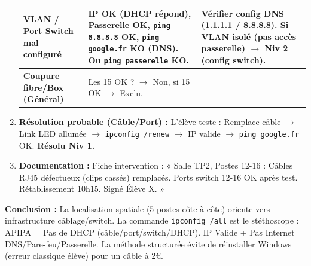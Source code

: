 \documentclass[11pt]{article}
\begin{document}
\begin{exoresolu}
\begin{enumerate}
\begin{tabularx}{\linewidth}{|l|X|X|}
          \hline
          \textbf{VLAN / Port Switch mal configuré} & IP OK (DHCP répond), Passerelle OK, \texttt{ping 8.8.8.8} OK, \texttt{ping google.fr} KO (DNS). Ou \texttt{ping passerelle} KO. & Vérifier config DNS (1.1.1.1 / 8.8.8.8). Si VLAN isolé (pas accès passerelle) $\rightarrow$ Niv 2 (config switch). \\
          \hline
          \textbf{Coupure fibre/Box (Général)} & Les 15 OK ? $\rightarrow$ Non, si 15 OK $\rightarrow$ Exclu. \\
          \hline
          \end{tabularx}
    \item \textbf{Résolution probable (Câble/Port) :} L'élève teste : Remplace câble $\rightarrow$ Link LED allumée $\rightarrow$ \texttt{ipconfig /renew} $\rightarrow$ IP valide $\rightarrow$ \texttt{ping google.fr} OK. \textbf{Résolu Niv 1.}
    \item \textbf{Documentation :} Fiche intervention : « Salle TP2, Postes 12-16 : Câbles RJ45 défectueux (clips cassés) remplacés. Ports switch 12-16 OK après test. Rétablissement 10h15. Signé Élève X. »
\end{enumerate}
\textbf{Conclusion :} La localisation spatiale (5 postes côte à côte) oriente vers infrastructure câblage/switch. La commande \texttt{ipconfig /all} est le stéthoscope : APIPA = Pas de DHCP (câble/port/switch/DHCP). IP Valide + Pas Internet = DNS/Pare-feu/Passerelle. La méthode structurée évite de réinstaller Windows (erreur classique élève) pour un câble à 2€.
\end{exoresolu}
\end{document}
